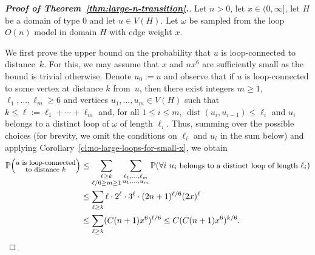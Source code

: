 \documentclass[12pt,reqno]{article}
\DeclareMathOperator{\dist}{dist}
\renewcommand{\Pr}{\mathbb{P}}
\begin{document}
\begin{proof}[{\bf Proof of Theorem~\ref{thm:large-n-transition}.}]
Let $n>0$, let $x \in (0,\infty]$, let $H$ be a domain of type 0 and let $u \in V(H)$.
Let $\omega$ be sampled from the loop $O(n)$ model in domain $H$ with edge weight $x$.

We first prove the upper bound on the probability that $u$ is loop-connected to distance~$k$. For this, we may assume that $x$ and $nx^6$ are sufficiently small as the bound is trivial otherwise. Denote $u_0 := u$ and observe that if $u$ is loop-connected to some vertex at distance $k$ from~$u$, then there exist integers $m \ge 1$, $\ell_1,\dots,\ell_m \ge 6$ and vertices $u_1,\dots,u_m \in V(H)$ such that $k \le \ell := \ell_1+\cdots+\ell_m$ and, for all $1 \le i \le m$, $\dist(u_i,u_{i-1}) \le \ell_i$ and $u_i$ belongs to a distinct loop of $\omega$ of length $\ell_i$. Thus, summing over the possible choices (for brevity, we omit the conditions on $\ell_i$ and $u_i$ in the sum below) and applying Corollary~\ref{cl:no-large-loops-for-small-x}, we obtain
\begin{align*}
    \Pr\Big(\substack{\text{\footnotesize{$u$ is loop-connected}}\\\text{\footnotesize{to distance $k$}}}\Big)
        &\le \sum_{\substack{\ell \ge k\\\ell/6 \ge m \ge 1}} \sum_{\substack{\ell_1,\dots,\ell_m\\u_1,\dots,u_m}} \Pr(\forall i~u_i\text{\small{ belongs to a distinct loop of length }}\ell_i) \\
        &\le \sum_{\ell \ge k} \ell \cdot 2^\ell \cdot 3^\ell \cdot (2n+1)^{\ell/6} (2x)^\ell \\
        &\le \sum_{\ell \ge k} (C(n+1)x^6)^{\ell/6}  \le C(C(n+1)x^6)^{k/6} .
\end{align*}


\end{proof}
\end{document}
